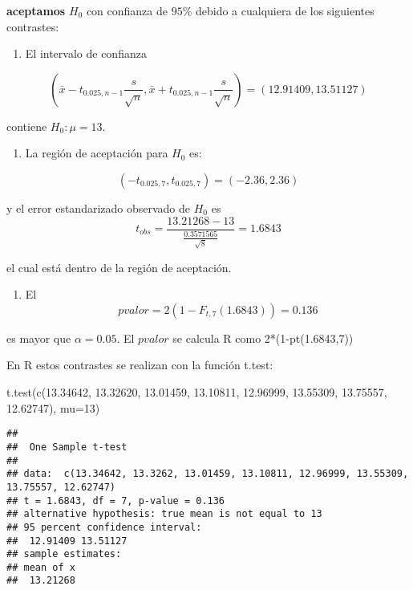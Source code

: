 \documentclass[
]{book}
\newenvironment{Shaded}{\begin{snugshade}}{\end{snugshade}}
\newcommand{\AttributeTok}[1]{\textcolor[rgb]{0.77,0.63,0.00}{#1}}
\newcommand{\DecValTok}[1]{\textcolor[rgb]{0.00,0.00,0.81}{#1}}
\newcommand{\FloatTok}[1]{\textcolor[rgb]{0.00,0.00,0.81}{#1}}
\newcommand{\FunctionTok}[1]{\textcolor[rgb]{0.00,0.00,0.00}{#1}}
\newcommand{\NormalTok}[1]{#1}
\providecommand{\tightlist}{%
  \setlength{\itemsep}{0pt}\setlength{\parskip}{0pt}}
\begin{document}
\textbf{aceptamos} \(H_0\) con confianza de \(95\%\) debido a cualquiera de los siguientes contrastes:

\begin{enumerate}
\def\labelenumi{\arabic{enumi}.}
\tightlist
\item
  El intervalo de confianza
\end{enumerate}

\[(\bar{x}-t_{0.025, n-1} \frac{s}{\sqrt{n}}, \bar{x}+t_{0.025, n-1} \frac{s}{ \sqrt{n}})=(12.91409, 13.51127)\]

contiene \(H_0:\mu=13\).

\begin{enumerate}
\def\labelenumi{\arabic{enumi}.}
\setcounter{enumi}{1}
\tightlist
\item
  La región de aceptación para \(H_0\) es:
\end{enumerate}

\[(-t_{0.025,7}, t_{0.025,7})=( -2.36, 2.36)\]

y el error estandarizado observado de \(H_0\) es
\[t_{obs} = \frac{13.21268-13}{\frac{0.3571565}{\sqrt{8}}}=1.6843\]

el cual está dentro de la región de aceptación.

\begin{enumerate}
\def\labelenumi{\arabic{enumi}.}
\setcounter{enumi}{2}
\tightlist
\item
  El \[pvalor=2(1-F_{t,7}(1.6843))=0.136\]
\end{enumerate}

es mayor que \(\alpha=0.05\). El \(pvalor\) se calcula R como 2*(1-pt(1.6843,7))

En R estos contrastes se realizan con la función t.test:

\begin{Shaded}
\begin{Highlighting}[]
\FunctionTok{t.test}\NormalTok{(}\FunctionTok{c}\NormalTok{(}\FloatTok{13.34642}\NormalTok{, }\FloatTok{13.32620}\NormalTok{, }\FloatTok{13.01459}\NormalTok{, }\FloatTok{13.10811}\NormalTok{,}
         \FloatTok{12.96999}\NormalTok{, }\FloatTok{13.55309}\NormalTok{, }\FloatTok{13.75557}\NormalTok{, }\FloatTok{12.62747}\NormalTok{), }
       \AttributeTok{mu=}\DecValTok{13}\NormalTok{)}
\end{Highlighting}
\end{Shaded}

\begin{verbatim}
## 
##  One Sample t-test
## 
## data:  c(13.34642, 13.3262, 13.01459, 13.10811, 12.96999, 13.55309, 13.75557, 12.62747)
## t = 1.6843, df = 7, p-value = 0.136
## alternative hypothesis: true mean is not equal to 13
## 95 percent confidence interval:
##  12.91409 13.51127
## sample estimates:
## mean of x 
##  13.21268
\end{verbatim}
\end{document}
